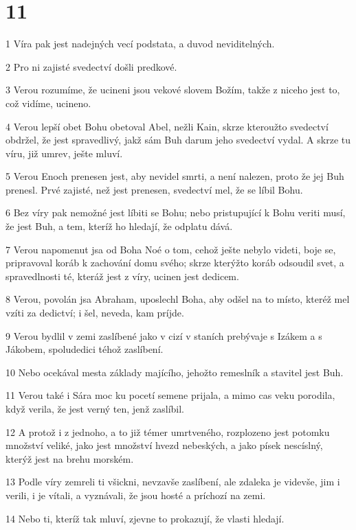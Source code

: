 \chapter{11}

\par 1 Víra pak jest nadejných vecí podstata, a duvod neviditelných.
\par 2 Pro ni zajisté svedectví došli predkové.
\par 3 Verou rozumíme, že ucineni jsou vekové slovem Božím, takže z niceho jest to, což vidíme, ucineno.
\par 4 Verou lepší obet Bohu obetoval Abel, nežli Kain, skrze kteroužto svedectví obdržel, že jest spravedlivý, jakž sám Buh darum jeho svedectví vydal. A skrze tu víru, již umrev, ješte mluví.
\par 5 Verou Enoch prenesen jest, aby nevidel smrti, a není nalezen, proto že jej Buh prenesl. Prvé zajisté, než jest prenesen, svedectví mel, že se líbil Bohu.
\par 6 Bez víry pak nemožné jest líbiti se Bohu; nebo pristupující k Bohu veriti musí, že jest Buh, a tem, kteríž ho hledají, že odplatu dává.
\par 7 Verou napomenut jsa od Boha Noé o tom, cehož ješte nebylo videti, boje se, pripravoval koráb k zachování domu svého; skrze kterýžto koráb odsoudil svet, a spravedlnosti té, kteráž jest z víry, ucinen jest dedicem.
\par 8 Verou, povolán jsa Abraham, uposlechl Boha, aby odšel na to místo, kteréž mel vzíti za dedictví; i šel, neveda, kam príjde.
\par 9 Verou bydlil v zemi zaslíbené jako v cizí v staních prebývaje s Izákem a s Jákobem, spoludedici téhož zaslíbení.
\par 10 Nebo ocekával mesta základy majícího, jehožto remeslník a stavitel jest Buh.
\par 11 Verou také i Sára moc ku pocetí semene prijala, a mimo cas veku porodila, když verila, že jest verný ten, jenž zaslíbil.
\par 12 A protož i z jednoho, a to již témer umrtveného, rozplozeno jest potomku množství veliké, jako jest množství hvezd nebeských, a jako písek nescíslný, kterýž jest na brehu morském.
\par 13 Podle víry zemreli ti všickni, nevzavše zaslíbení, ale zdaleka je videvše, jim i verili, i je vítali, a vyznávali, že jsou hosté a príchozí na zemi.
\par 14 Nebo ti, kteríž tak mluví, zjevne to prokazují, že vlasti hledají.
